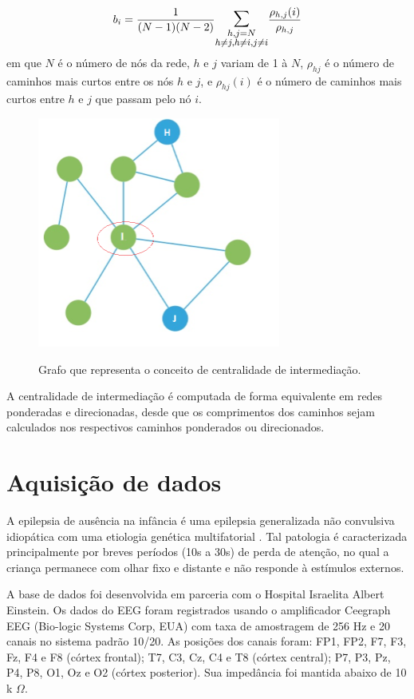 \documentclass[
	12pt,				%
	openright,			%
	twoside,			%
	a4paper,			%
	english,			%
	french,				%
	spanish,			%
	brazil				%
	]{abntex2}
\begin{document}
\begin{equation}
    b_i = \frac{1}{(N-1)(N-2)} \mathlarger{\mathlarger{\sum}}_{\substack{h,j=N \\ h\neq j, h \neq i, j \neq i}} \frac{\rho_{h,j}(i)}{\rho_{h,j}}
\end{equation}
em que $N$ é o número de nós da rede, $h$ e $j$ variam de 1 à $N$, $\rho_{hj}$ é o número de caminhos mais curtos entre os nós $h$ e $j$, e $\rho_{hj} (i) $ é o número de caminhos mais curtos entre $h$ e $j$ que passam pelo nó $i$. 
\begin{figure}[h]
\centering
\includegraphics[width=8cm]{figs/BC.png}
\label{BC}
\caption{Grafo que representa o conceito de centralidade de intermediação.}
\end{figure}

A centralidade de intermediação é computada de forma equivalente em redes ponderadas e direcionadas, desde que os comprimentos dos caminhos sejam calculados nos respectivos caminhos ponderados ou direcionados.
\chapter{Aquisição de dados}

A epilepsia de ausência na infância é uma epilepsia generalizada não convulsiva idiopática com uma etiologia genética multifatorial \cite{crunelli2002childhood}. Tal patologia é caracterizada principalmente por breves períodos (10s a 30s) de perda de atenção, no qual a criança permanece com olhar fixo e distante e não responde à estímulos externos.

A base de dados foi desenvolvida em parceria com o Hospital Israelita Albert Einstein. Os dados do EEG foram registrados usando o amplificador Ceegraph EEG (Bio-logic Systems Corp, EUA) com taxa de amostragem de 256 Hz e 20 canais no sistema padrão 10/20. As posições dos canais foram: FP1, FP2, F7, F3, Fz, F4 e F8 (córtex frontal); T7, C3, Cz, C4 e T8 (córtex central); P7, P3, Pz, P4, P8, O1, Oz e O2 (córtex posterior). Sua impedância foi mantida abaixo de 10 k $ \Omega $. 
\end{document}
